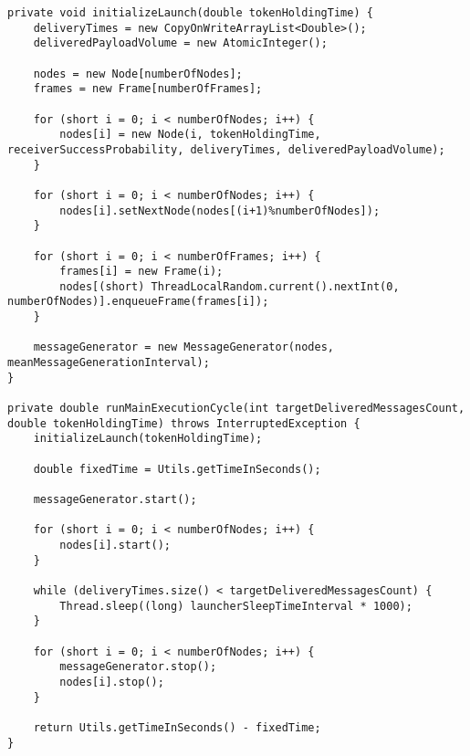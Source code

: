\begin{lstlisting}
private void initializeLaunch(double tokenHoldingTime) {
    deliveryTimes = new CopyOnWriteArrayList<Double>();
    deliveredPayloadVolume = new AtomicInteger();

    nodes = new Node[numberOfNodes];
    frames = new Frame[numberOfFrames];

    for (short i = 0; i < numberOfNodes; i++) {
        nodes[i] = new Node(i, tokenHoldingTime, receiverSuccessProbability, deliveryTimes, deliveredPayloadVolume);
    }

    for (short i = 0; i < numberOfNodes; i++) {
        nodes[i].setNextNode(nodes[(i+1)%numberOfNodes]);
    }

    for (short i = 0; i < numberOfFrames; i++) {
        frames[i] = new Frame(i);
        nodes[(short) ThreadLocalRandom.current().nextInt(0, numberOfNodes)].enqueueFrame(frames[i]);
    }

    messageGenerator = new MessageGenerator(nodes, meanMessageGenerationInterval);
}

private double runMainExecutionCycle(int targetDeliveredMessagesCount, double tokenHoldingTime) throws InterruptedException {
    initializeLaunch(tokenHoldingTime);

    double fixedTime = Utils.getTimeInSeconds();

    messageGenerator.start();

    for (short i = 0; i < numberOfNodes; i++) {
        nodes[i].start();
    }

    while (deliveryTimes.size() < targetDeliveredMessagesCount) {
        Thread.sleep((long) launcherSleepTimeInterval * 1000);
    }

    for (short i = 0; i < numberOfNodes; i++) {
        messageGenerator.stop();
        nodes[i].stop();
    }

    return Utils.getTimeInSeconds() - fixedTime;
}

\end{lstlisting}